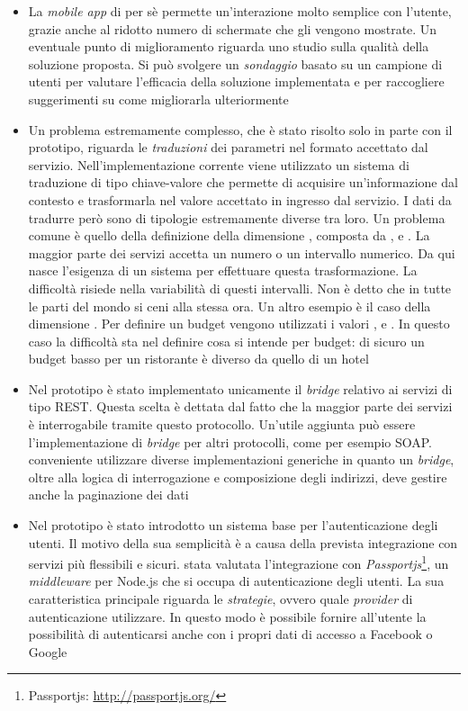 \begin{itemize}
	\item
	La \emph{mobile app} di per sè permette un'interazione molto semplice con l'utente, grazie anche al ridotto numero di schermate che gli vengono mostrate. Un eventuale punto di miglioramento riguarda uno studio sulla qualità della soluzione proposta. Si può svolgere un \emph{sondaggio} basato su un campione di utenti per valutare l'efficacia della soluzione implementata e per raccogliere suggerimenti su come migliorarla ulteriormente
	\item
	Un problema estremamente complesso, che è stato risolto solo in parte con il prototipo, riguarda le \emph{traduzioni} dei parametri nel formato accettato dal servizio. Nell'implementazione corrente viene utilizzato un sistema di traduzione di tipo chiave-valore che permette di acquisire un'informazione dal contesto e trasformarla nel valore accettato in ingresso dal servizio. I dati da tradurre però sono di tipologie estremamente diverse tra loro. Un problema comune è quello della definizione della dimensione , composta da ,  e . La maggior parte dei servizi accetta un numero o un intervallo numerico. Da qui nasce l'esigenza di un sistema per effettuare questa trasformazione. La difficoltà risiede nella variabilità di questi intervalli. Non è detto che in tutte le parti del mondo si ceni alla stessa ora. Un altro esempio è il caso della dimensione . Per definire un budget vengono utilizzati i valori ,  e . In questo caso la difficoltà sta nel definire cosa si intende per budget: di sicuro un budget basso per un ristorante è diverso da quello di un hotel
	\item
	Nel prototipo è stato implementato unicamente il \emph{bridge} relativo ai servizi di tipo REST. Questa scelta è dettata dal fatto che la maggior parte dei servizi è interrogabile tramite questo protocollo. Un'utile aggiunta può essere l'implementazione di \emph{bridge} per altri protocolli, come per esempio SOAP. \upe conveniente utilizzare diverse implementazioni generiche in quanto un \emph{bridge}, oltre alla logica di interrogazione e composizione degli indirizzi, deve gestire anche la paginazione dei dati
	\item
	Nel prototipo è stato introdotto un sistema base per l'autenticazione degli utenti. Il motivo della sua semplicità è a causa della prevista integrazione con servizi più flessibili e sicuri. \upe stata valutata l'integrazione con \emph{Passportjs}\footnote{Passportjs: \url{http://passportjs.org/}}, un \emph{middleware} per Node.js che si occupa di autenticazione degli utenti. La sua caratteristica principale riguarda le \emph{strategie}, ovvero quale \emph{provider} di autenticazione utilizzare. In questo modo è possibile fornire all'utente la possibilità di autenticarsi anche con i propri dati di accesso a Facebook o Google

\end{itemize}
